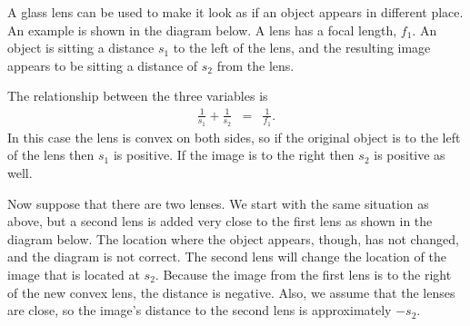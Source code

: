 A glass lens can be used to make it look as if an object appears in different place. An example is shown in the diagram below.
  A lens has a focal length, $f_1$. An object is sitting a distance $s_1$ to the left of the lens, and the resulting image
  appears to be sitting a distance of $s_2$ from the lens.

  \newcommand{\stickFigure}[3]{%
    \begin{scope}[shift={(#1,#2)},y=#3]
      \fill[black] (0,1.0) circle[radius=3pt];       %
      \draw[black] (0,1.0) -- (0,.33);               %
      \draw[black] (-0.25,0) -- (0,.33) -- (.25,0);  %
      \draw[black] (-.3,0.8) -- (.3,0.8);            %
    \end{scope}
  }

    The relationship between the three variables is
    \begin{eqnarray}
      \label{eqn:lensDistOne}
      \frac{1}{s_1} + \frac{1}{s_2} & = & \frac{1}{f_1}.
    \end{eqnarray}
    In this case the lens is convex on both sides, so if the original object is to the left of the lens then $s_1$ is positive.
    If the image is to the right then $s_2$ is positive as well.

    Now suppose that there are two lenses. We start with the same situation as above, but a second lens is added very close to the first lens as shown in the diagram below.
    The location where the object appears, though, has not changed, and the diagram is not correct. The second lens will change the location of the image that is located at $s_2$.
    Because the image from the first lens is to the right of the new convex lens, the distance is negative. Also, we assume that the lenses are close,
    so the image's distance to the second lens is approximately $-s_2$.

